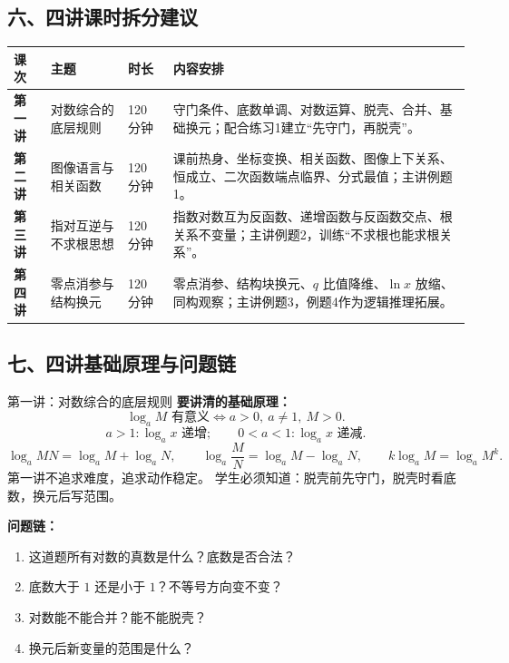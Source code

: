 \documentclass[11pt,a4paper]{ctexart}
\begin{document}
\subsection*{六、四讲课时拆分建议}

\begin{center}
\renewcommand{\arraystretch}{1.25}
\begin{tabularx}{0.95\linewidth}{>{\bfseries}p{2.2cm} p{3.1cm} p{2.1cm} X}
\toprule
课次 & 主题 & 时长 & 内容安排 \\
\midrule
第一讲 & 对数综合的底层规则 & 120 分钟 & 守门条件、底数单调、对数运算、脱壳、合并、基础换元；配合练习1建立“先守门，再脱壳”。 \\
第二讲 & 图像语言与相关函数 & 120 分钟 & 课前热身、坐标变换、相关函数、图像上下关系、恒成立、二次函数端点临界、分式最值；主讲例题1。 \\
第三讲 & 指对互逆与不求根思想 & 120 分钟 & 指数对数互为反函数、递增函数与反函数交点、根关系不变量；主讲例题2，训练“不求根也能求根关系”。 \\
第四讲 & 零点消参与结构换元 & 120 分钟 & 零点消参、结构块换元、$q$ 比值降维、$\ln x$ 放缩、同构观察；主讲例题3，例题4作为逻辑推理拓展。 \\
\bottomrule
\end{tabularx}
\end{center}

\subsection*{七、四讲基础原理与问题链}

\begin{teachbox}{第一讲：对数综合的底层规则}
\textbf{要讲清的基础原理：}
\[
\log_a M \text{ 有意义}\Longleftrightarrow a>0,\ a\ne1,\ M>0.
\]
\[
a>1:\log_a x \text{ 递增};\qquad 0<a<1:\log_a x \text{ 递减}.
\]
\[
\log_a MN=\log_a M+\log_a N,\qquad
\log_a\frac MN=\log_a M-\log_a N,\qquad
k\log_a M=\log_a M^k.
\]
第一讲不追求难度，追求动作稳定。
学生必须知道：脱壳前先守门，脱壳时看底数，换元后写范围。

\textbf{问题链：}
\begin{enumerate}
  \item 这道题所有对数的真数是什么？底数是否合法？
  \item 底数大于 $1$ 还是小于 $1$？不等号方向变不变？
  \item 对数能不能合并？能不能脱壳？
  \item 换元后新变量的范围是什么？
\end{enumerate}
\end{teachbox}
\end{document}
